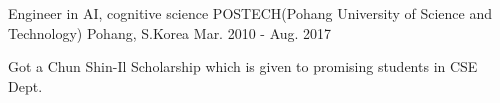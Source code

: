 

\begin{cventries}

  \cventry
    {Engineer in AI, cognitive science} %
    {POSTECH(Pohang University of Science and Technology)} %
    {Pohang, S.Korea} %
    {Mar. 2010 - Aug. 2017} %
    {
      \begin{cvitems} %
        \item {Got a Chun Shin-Il Scholarship which is given to promising students in CSE Dept.}
      \end{cvitems}
    }

\end{cventries}
